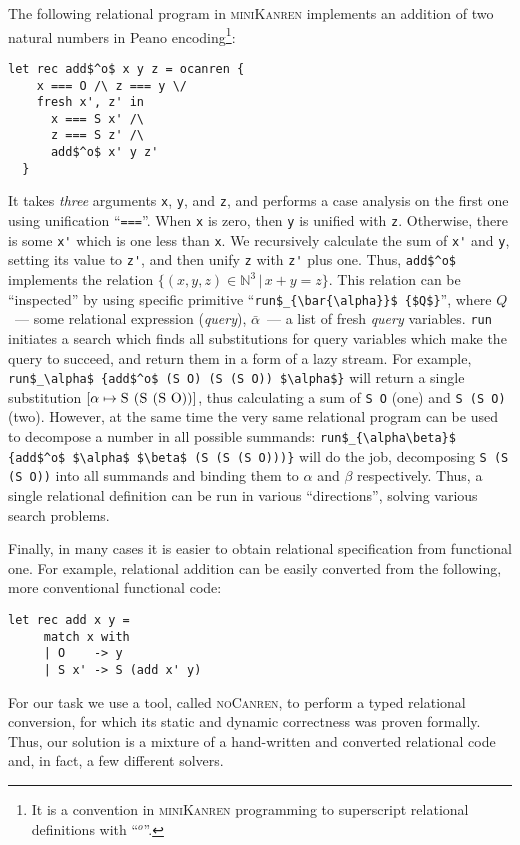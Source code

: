 The following relational program in \textsc{miniKanren} implements an addition of two natural numbers in Peano encoding\footnote{It is a
convention in \textsc{miniKanren} programming to superscript relational definitions with ``$^o$''.}:

\begin{lstlisting}[language=ocanren,basicstyle=\small]
  let rec add$^o$ x y z = ocanren {
    x === O /\ z === y \/
    fresh x', z' in
      x === S x' /\
      z === S z' /\
      add$^o$ x' y z'
  }
\end{lstlisting}

It takes \emph{three} arguments \lstinline|x|, \lstinline|y|, and \lstinline|z|, and performs a
case analysis on the first one using unification ``\lstinline[language=ocanren]|===|''. When
\lstinline|x| is zero, then \lstinline|y| is unified with \lstinline|z|. Otherwise, there is some
\lstinline|x'| which is one less than \lstinline|x|. We recursively calculate the sum of \lstinline|x'| and
\lstinline|y|, setting its value to \lstinline|z'|, and then unify \lstinline|z| with \lstinline|z'| plus one. Thus,
\lstinline|add$^o$| implements the relation $\{(x, y, z)\in\mathbb{N}^3\, |\, x+y=z\}$. This relation can
be ``inspected'' by using specific primitive ``\lstinline[language=ocanren]|run$_{\bar{\alpha}}$ {$Q$}|'', where
$Q$~--- some relational expression (\emph{query}), $\bar{\alpha}$~--- a list of fresh \emph{query} variables.
\lstinline[language=ocanren]|run| initiates a search which finds all substitutions for query variables which
make the query to succeed, and return them in a form of a lazy stream. For example, \lstinline[language=ocanren,basicstyle=\small]|run$_\alpha$ {add$^o$ (S O) (S (S O)) $\alpha$}|
will return a single substitution $[\alpha\mapsto \mbox{\lstinline|S (S (S O))|}]$, thus calculating a
sum of \lstinline|S O| (one) and \lstinline|S (S O)| (two). However, at the same time the very same relational
program can be used to decompose a number in all possible summands: \lstinline[language=ocanren,basicstyle=\small]|run$_{\alpha\beta}$ {add$^o$ $\alpha$ $\beta$ (S (S (S O)))}|
will do the job, decomposing \lstinline|S (S (S O))| into all summands and binding them to $\alpha$ and $\beta$ respectively.
Thus, a single relational definition can be run in various ``directions'', solving various search problems.

Finally, in many cases it is easier to obtain relational specification from functional one. For example,
relational addition can be easily converted from the following, more conventional functional code:

\begin{lstlisting}[language=ocanren,basicstyle=\small]
   let rec add x y =
     match x with
     | O    -> y
     | S x' -> S (add x' y)
\end{lstlisting}

For our task we use a tool, called \textsc{noCanren}, to perform a typed relational conversion\cite{lozov2017typed}, for which its static and dynamic
correctness was proven formally. Thus, our solution is a mixture of a hand-written and converted relational code and, in fact, a few
different solvers.


